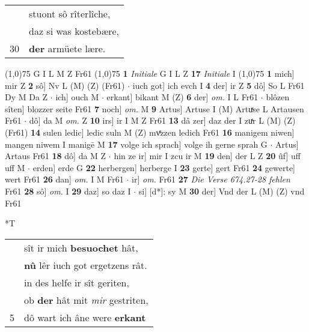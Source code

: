 \documentclass[8pt,a4paper,notitlepage]{article}
\begin{document}
\begin{table}[ht]
\begin{minipage}[t]{0.5\linewidth}
\begin{tabular}{rl}
 & stuont sô rîterlîche,\\ 
 & daz si was kostebære,\\ 
30 & \textbf{der} armüete lære.\\ 
\end{tabular}
\scriptsize
\line(1,0){75} \newline
G I L M Z Fr61 \newline
\line(1,0){75} \newline
\textbf{1} \textit{Initiale} G I L Z  \textbf{17} \textit{Initiale} I  \newline
\line(1,0){75} \newline
\textbf{1} mich] mir Z \textbf{2} sô] Nv L (M) (Z) (Fr61)  $\cdot$ iuch got] ich evch I \textbf{4} der] ir Z \textbf{5} dô] So L Fr61 Dy M Da Z  $\cdot$ ich] ouch M  $\cdot$ erkant] bikant M (Z) \textbf{6} der] \textit{om.} I L Fr61  $\cdot$ blôzen sîten] blozzer seite Fr61 \textbf{7} noch] \textit{om.} M \textbf{9} Artus] Artuse I (M) Artuͯse L Artausen Fr61  $\cdot$ dô] da M \textit{om.} Z \textbf{10} irs] ir I M Z Fr61 \textbf{13} dâ zer] daz der I zuͯr L (M) (Z) (Fr61) \textbf{14} sulen ledic] ledic suln M (Z) mvͤzzen ledich Fr61 \textbf{16} manigem niwen] mangen niwem I manigē M \textbf{17} volge ich sprach] volge ih gerne sprah G  $\cdot$ Artus] Artaus Fr61 \textbf{18} dô] da M Z  $\cdot$ hin ze ir] mir I zcu ir M \textbf{19} den] der L Z \textbf{20} ûf] uff uff M  $\cdot$ erden] erde G \textbf{22} herbergen] herberge I \textbf{23} gerte] gert Fr61 \textbf{24} gewerte] wert Fr61 \textbf{26} dan] \textit{om.} I M Fr61  $\cdot$ ir] \textit{om.} Fr61 \textbf{27} \textit{Die Verse 674.27-28 fehlen} Fr61  \textbf{28} sô] \textit{om.} I \textbf{29} daz] so daz I  $\cdot$ si] [d*]: sy M \textbf{30} der] Vnd der L (M) (Z) vnd Fr61 \newline
\end{minipage}
\hspace{0.5cm}
\begin{minipage}[t]{0.5\linewidth}
\small
\begin{center}*T
\end{center}
\begin{tabular}{rl}
 & sît ir mich \textbf{besuochet} hât,\\ 
 & \textbf{nû} lêr iuch got ergetzens rât.\\ 
 & in des helfe ir sît geriten,\\ 
 & ob \textbf{der} hât mit \textit{mir} gestriten,\\ 
5 & dô wart ich âne were \textbf{erkant}\\ 

\end{tabular}
\end{minipage}
\end{table}
\end{document}
